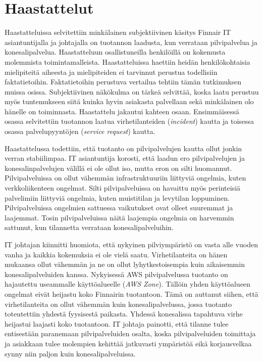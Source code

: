 \section{Haastattelut}
Haastatteluissa selvitettiin minkälainen subjektiivinen käsitys Finnair IT asiantuntijalla ja johtajalla on tuotannon laadusta, kun verrataan pilvipalvelua ja konesalipalvelua. Haastatteluun osallistuneilla henkilöillä on kokemusta molemmista toimintamalleista. Haastatteluissa haettiin heidän henkilökohtaisia mielipiteitä aiheesta ja mielipiteiden ei tarvinnut perustua todellisiin faktatietoihin. Faktatietoihin perustuva vertailua tehtiin tämän tutkimuksen muissa osissa. Subjektiivinen näkökulma on tärkeä selvittää, koska laatu perustuu myös tuntemukseen siitä kuinka hyvin asiakasta palvellaan sekä minkälainen olo hänelle on toiminnasta. Haastattelu jakautui kahteen osaan. Ensimmäisessä osassa selvitettiin tuotannon laatua virhetilanteiden (\emph{incident}) kautta ja toisessa osassa palvelupyyntöjen (\emph{service request}) kautta.

Haastattelussa todettiin, että tuotanto on pilvipalvelujen kautta ollut jonkin verran stabiilimpaa. IT asiantuntija korosti, että laadun ero pilvipalvelujen ja konesalinpalvelujen välillä ei ole ollut iso, mutta eron on silti huomannut. Pilvipalveluissa on ollut vähemmän infrastruktuuriin liittyviä ongelmia, kuten verkkoliikenteen ongelmat. Silti pilvipalveluissa on havaittu myös perinteisiä palvelimiin liittyviä ongelmia, kuten muistitilan ja levytilan loppuminen. Pilvipalveluissa ongelmien sattuessa vaikutukset ovat olleet suuremmat ja laajemmat. Tosin pilvipalveluissa näitä laajempia ongelmia on harvemmin sattunut, kun tilannetta verrataan konesalipalveluihin.

IT johtajan kiinnitti huomiota, että nykyinen pilviympäristö on vasta alle vuoden vanha ja kaikkia kokemuksia ei ole vielä saatu. Virhetilanteita on hänen mukaansa ollut vähemmän ja ne on ollut lyhytkestoisempia kuin aikaisemmin konesalipalveluiden kanssa. Nykyisessä AWS pilvipalvelussa tuotanto on hajautettu useammalle käyttöalueelle (\emph{AWS Zone}). Tällöin yhden käyttöalueen ongelmat eivät heijastu koko Finnairin tuotantoon. Tämä on auttanut siihen, että virhetilanteita on ollut vähemmän kuin konesalipalvelussa, jossa tuotanto toteutettiin yhdestä fyysisestä paikasta. Yhdessä konesalissa tapahtuva virhe heijastui laajasti koko tuotantoon. IT johtaja painotti, että tilanne tulee entisestään paranemaan pilvipalveluiden osalta, koska pilvipalveluiden toimittaja ja asiakkaan tulee molempien kehittää jatkuvasti ympäristöä eikä korjausvelkaa synny niin paljon kuin konesalipalveluissa.

